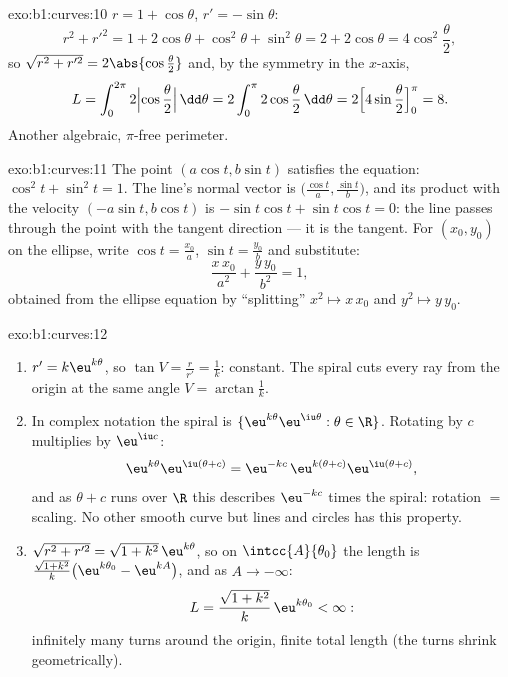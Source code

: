 \begin{solution}{exo:b1:curves:10}
$r = 1 + \cos\theta$, $r' = -\sin\theta$:
\[
r^2 + r'^2 = 1 + 2\cos\theta + \cos^2\theta + \sin^2\theta
= 2 + 2\cos\theta = 4\cos^2\frac\theta2 ,
\]
so $\sqrt{r^2 + r'^2} = 2\abs{\cos\frac\theta2}$ and, by the
symmetry in the $x$-axis,
\[
L = \int_0^{2\pi} 2\Bigl|\cos\frac\theta2\Bigr|\,\dd\theta
= 2\int_0^{\pi} 2\cos\frac\theta2\,\dd\theta
= 2\Bigl[4\sin\frac\theta2\Bigr]_0^{\pi} = 8 .
\]
Another algebraic, $\pi$-free perimeter.
\end{solution}

\begin{solution}{exo:b1:curves:11}
The point $(a\cos t, b\sin t)$ satisfies the equation:
$\cos^2 t + \sin^2 t = 1$. The line's normal vector is
$\bigl(\frac{\cos t}a, \frac{\sin t}b\bigr)$, and its product
with the velocity $(-a\sin t, b\cos t)$ is $-\sin t\cos t +
\sin t\cos t = 0$: the line passes through the point with the
tangent direction --- it is the tangent. For $(x_0, y_0)$ on the
ellipse, write $\cos t = \frac{x_0}a$, $\sin t = \frac{y_0}b$ and
substitute:
\[
\frac{x\,x_0}{a^2} + \frac{y\,y_0}{b^2} = 1 ,
\]
obtained from the ellipse equation by ``splitting'' $x^2 \mapsto
x\,x_0$ and $y^2 \mapsto y\,y_0$.
\end{solution}

\begin{solution}{exo:b1:curves:12}
\begin{enumerate}
  \item $r' = k\eu^{k\theta}$, so $\tan V = \frac{r}{r'} =
        \frac1k$: constant. The spiral cuts every ray from the
        origin at the same angle $V = \arctan\frac1k$.
  \item In complex notation the spiral is $\{\eu^{k\theta}
        \eu^{\iu\theta} : \theta \in \R\}$. Rotating by $c$
        multiplies by $\eu^{\iu c}$:
        \[
        \eu^{k\theta}\eu^{\iu(\theta + c)}
        = \eu^{-kc}\,\eu^{k(\theta + c)}\eu^{\iu(\theta+c)} ,
        \]
        and as $\theta + c$ runs over $\R$ this describes
        $\eu^{-kc}$ times the spiral: rotation $=$ scaling. No
        other smooth curve but lines and circles has this
        property.
  \item $\sqrt{r^2 + r'^2} = \sqrt{1 + k^2}\,\eu^{k\theta}$, so
        on $\intcc{A}{\theta_0}$ the length is
        $\frac{\sqrt{1+k^2}}{k}\bigl(\eu^{k\theta_0} -
        \eu^{kA}\bigr)$, and as $A \to -\infty$:
        \[
        L = \frac{\sqrt{1 + k^2}}{k}\,\eu^{k\theta_0} < \infty :
        \]
        infinitely many turns around the origin, finite total
        length (the turns shrink geometrically).
\end{enumerate}
\end{solution}

